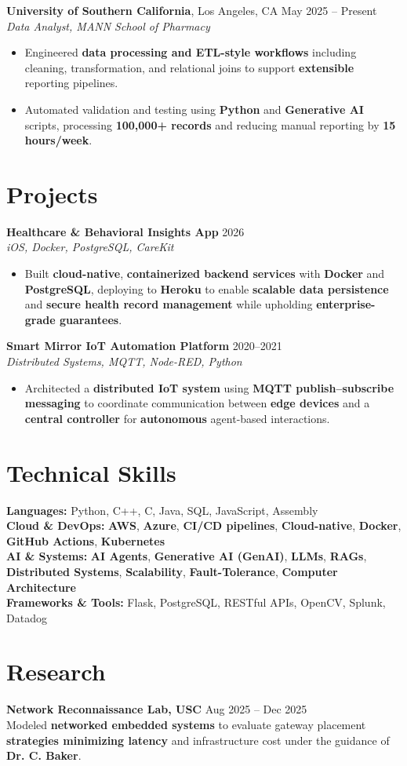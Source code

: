 \documentclass[letterpaper,11pt]{article}
\begin{document}
\textbf{University of Southern California}, Los Angeles, CA \hfill May 2025 -- Present \\
\textit{Data Analyst, MANN School of Pharmacy}
\begin{itemize}
    \item Engineered \textbf{data processing and ETL-style workflows} including cleaning, transformation, and relational joins to support \textbf{extensible} reporting pipelines.
    \item Automated validation and testing using \textbf{Python} and \textbf{Generative AI} scripts, processing \textbf{100,000+ records} and reducing manual reporting by \textbf{15 hours/week}.
\end{itemize}

\section*{Projects}
\textbf{Healthcare \& Behavioral Insights App} \hfill 2026 \\
\textit{iOS, Docker, PostgreSQL, CareKit}
\begin{itemize}
    \item Built \textbf{cloud-native}, \textbf{containerized backend services} with \textbf{Docker} and \textbf{PostgreSQL}, deploying to \textbf{Heroku} to enable \textbf{scalable data persistence} and \textbf{secure health record management} while upholding \textbf{enterprise-grade guarantees}.
\end{itemize}

\textbf{Smart Mirror IoT Automation Platform} \hfill 2020--2021 \\
\textit{Distributed Systems, MQTT, Node-RED, Python}
\begin{itemize}
    \item Architected a \textbf{distributed IoT system} using \textbf{MQTT publish–subscribe messaging} to coordinate communication between \textbf{edge devices} and a \textbf{central controller} for \textbf{autonomous} agent-based interactions.
\end{itemize}

\section*{Technical Skills}
\textbf{Languages:} Python, C++, C, Java, SQL, JavaScript, Assembly \\
\textbf{Cloud \& DevOps:} \textbf{AWS}, \textbf{Azure}, \textbf{CI/CD pipelines}, \textbf{Cloud-native}, \textbf{Docker}, \textbf{GitHub Actions}, \textbf{Kubernetes} \\
\textbf{AI \& Systems:} \textbf{AI Agents}, \textbf{Generative AI (GenAI)}, \textbf{LLMs}, \textbf{RAGs}, \textbf{Distributed Systems}, \textbf{Scalability}, \textbf{Fault-Tolerance}, \textbf{Computer Architecture} \\
\textbf{Frameworks \& Tools:} Flask, PostgreSQL, RESTful APIs, OpenCV, Splunk, Datadog

\section*{Research}
\textbf{Network Reconnaissance Lab, USC} \hfill Aug 2025 -- Dec 2025 \\
Modeled \textbf{networked embedded systems} to evaluate gateway placement \textbf{strategies minimizing latency} and infrastructure cost under the guidance of \textbf{Dr. C. Baker}.
\end{document}
